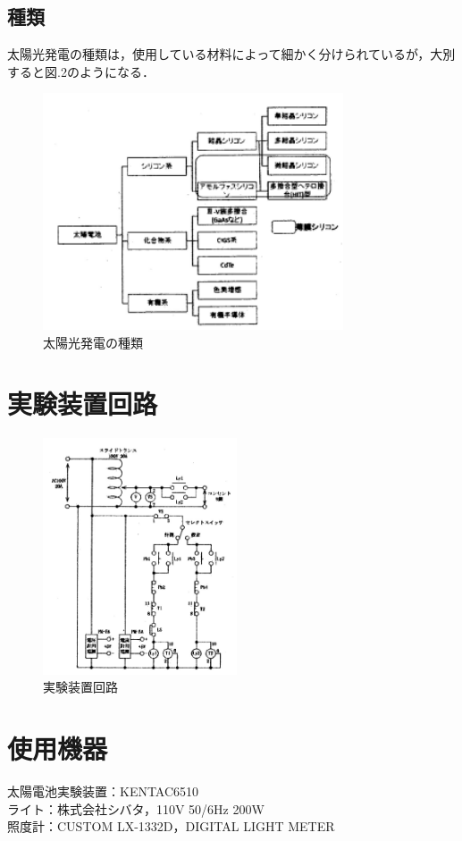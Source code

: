 \subsection{種類}
太陽光発電の種類は，使用している材料によって細かく分けられているが，大別すると図.2のようになる．\\
\begin{figure}[H]
  \centering
  \includegraphics[height=7cm]{./fig/fig02.png}
  \caption{太陽光発電の種類}
\end{figure}

\section{実験装置回路}
\begin{figure}[H]
  \centering
  \includegraphics[height=7cm]{./fig/fig03.png}
  \caption{実験装置回路}
\end{figure}

\section{使用機器}
太陽電池実験装置：KENTAC6510\\
ライト：株式会社シバタ，110V 50/6Hz 200W\\
照度計：CUSTOM LX-1332D，DIGITAL LIGHT METER\\

